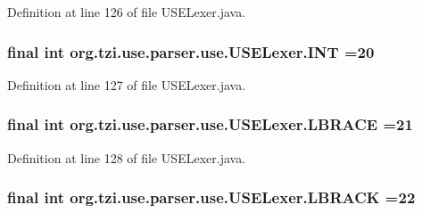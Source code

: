 Definition at line 126 of file U\-S\-E\-Lexer.\-java.

\hypertarget{classorg_1_1tzi_1_1use_1_1parser_1_1use_1_1_u_s_e_lexer_a72cc7d561586c3960993c11e0914e90a}{
\subsubsection[{I\-N\-T}]{\setlength{\rightskip}{0pt plus 5cm}final int org.\-tzi.\-use.\-parser.\-use.\-U\-S\-E\-Lexer.\-I\-N\-T =20\hspace{0.3cm}{\ttfamily [static]}}}\label{classorg_1_1tzi_1_1use_1_1parser_1_1use_1_1_u_s_e_lexer_a72cc7d561586c3960993c11e0914e90a}


Definition at line 127 of file U\-S\-E\-Lexer.\-java.

\hypertarget{classorg_1_1tzi_1_1use_1_1parser_1_1use_1_1_u_s_e_lexer_abc8144b7eb19ab367387506d10279485}{
\subsubsection[{L\-B\-R\-A\-C\-E}]{\setlength{\rightskip}{0pt plus 5cm}final int org.\-tzi.\-use.\-parser.\-use.\-U\-S\-E\-Lexer.\-L\-B\-R\-A\-C\-E =21\hspace{0.3cm}{\ttfamily [static]}}}\label{classorg_1_1tzi_1_1use_1_1parser_1_1use_1_1_u_s_e_lexer_abc8144b7eb19ab367387506d10279485}


Definition at line 128 of file U\-S\-E\-Lexer.\-java.

\hypertarget{classorg_1_1tzi_1_1use_1_1parser_1_1use_1_1_u_s_e_lexer_abb3400bfd23a0fd8808af235aa40a5f1}{
\subsubsection[{L\-B\-R\-A\-C\-K}]{\setlength{\rightskip}{0pt plus 5cm}final int org.\-tzi.\-use.\-parser.\-use.\-U\-S\-E\-Lexer.\-L\-B\-R\-A\-C\-K =22\hspace{0.3cm}{\ttfamily [static]}}}\label{classorg_1_1tzi_1_1use_1_1parser_1_1use_1_1_u_s_e_lexer_abb3400bfd23a0fd8808af235aa40a5f1}


